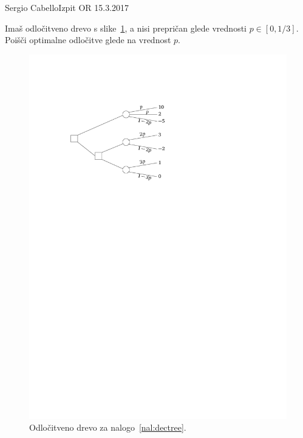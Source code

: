 \begin{naloga}{Sergio Cabello}{Izpit OR 15.3.2017}
\begin{vprasanje}
Imaš odločitveno drevo s slike~\ref{fig:dectree},
a nisi prepričan glede vrednosti $p \in [0, 1/3]$.
Poišči optimalne odločitve glede na vrednost $p$.

\begin{figure}[t]
	\centering
	\includegraphics{slike/decision-tree.pdf}
    \caption{Odločitveno drevo za nalogo~\ref{nal:dectree}.}
    \label{fig:dectree}
\end{figure}

\end{vprasanje}
\begin{odgovor}
\end{odgovor}
\end{naloga}


